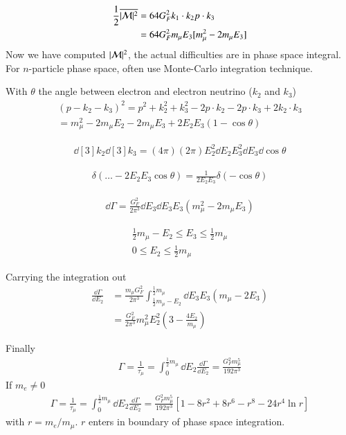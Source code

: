 \begin{align*}
   \frac{1}{2} \overline{|\mathcal{M}|^2} &= 64 G_F^2 k_1\cdot k_2 p \cdot k_3 \\
   &= 64 G_F^2 m_\mu E_3 [m_\mu^2 - 2 m_\mu E_3]
\end{align*}
Now we have computed $|\mathcal{M}|^2$, the actual difficulties are in phase space integral. For $n$-particle phase space, often use Monte-Carlo integration technique.

With $\theta$ the angle between electron and electron neutrino ($k_2$ and $k_3$)
\begin{align*}
   (p-k_2 - k_3)^2 = p^2 + k_2^2 + k_3^2 - 2 p \cdot k_2 -2 p\cdot k_3 + 2k_2 \cdot k_3 \\
   = m_\mu^2 - 2 m_\mu E_2 - 2m_\mu E_3 + 2 E_2 E_3 (1-\cos \theta)
\end{align*}

\begin{align*}
   \dd[3]{k_2} \dd[3]{k_3} = (4\pi) (2\pi) E_2^2 \dd{E_2} E_3^2 \dd{E_3} \dd{\cos \theta}
\end{align*}

\begin{align*}
   \delta(\dots - 2 E_2 E_3 \cos \theta) = \frac{1}{2E_2 E_3} \delta(- \cos \theta)
\end{align*}

\begin{align*}
   \dd{\Gamma} = \frac{G_F^2}{2 \pi^3} \dd{E_3} \dd{E_3} E_3 (m_\mu^2 - 2 m_\mu E_3)
\end{align*}

\begin{align*}
   \frac{1}{2} m_\mu - E_2 \leq E_3 \leq \frac{1}{2} m_\mu \\
   0 \leq E_2 \leq \frac{1}{2} m_\mu
\end{align*}

Carrying the integration out
\begin{align*}
   \frac{\dd{\Gamma}}{\dd{E_2}} &= \frac{m_\mu G_F^2}{2\pi^3} \int_{\frac{1}{2}m_\mu - E_2}^{\frac{1}{2}m_\mu} \dd{E_3} E_3 (m_\mu - 2 E_3) \\
                                &= \frac{G_F^2}{2\pi^3} m_\mu^2 E_2^2 \left( 3 - \frac{4E_2}{m_\mu} \right)
\end{align*}

Finally
\begin{align*}
   \Gamma = \frac{1}{\tau_\mu} = \int^{\frac{1}{2}m_\mu}_0 \dd{E_2} \frac{\dd{\Gamma}}{\dd{E_2}} = \frac{G_F^2 m_\mu^5}{192 \pi^3}
\end{align*}
If $m_e \neq 0$
\begin{align*}
   \Gamma = \frac{1}{\tau_\mu} = \int^{\frac{1}{2}m_\mu}_0 \dd{E_2} \frac{\dd{\Gamma}}{\dd{E_2}} = \frac{G_F^2 m_\mu^5}{192 \pi^3} \left[ 1 - 8r^2 + 8r^6 - r^8 - 24 r^4 \ln{r} \right]
\end{align*}
with $r = m_e / m_\mu$. $r$ enters in boundary of phase space integration.

